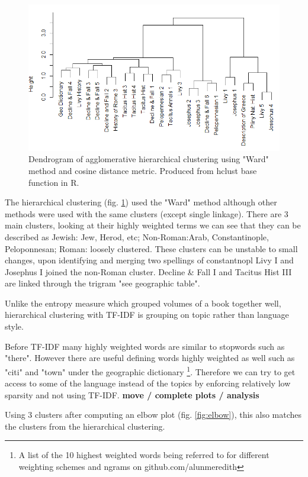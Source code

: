 \documentclass[a4paper,10pt, twocolumn]{article}
\begin{document}
\begin{figure}
	\includegraphics[width=0.9\linewidth]{dendorgram.png}
	\centering
	\caption{Dendrogram of agglomerative hierarchical  clustering using "Ward" method and cosine distance metric. Produced from hclust base function in R.}
	\label{fig:heir}
\end{figure} 

The hierarchical  clustering (fig. \ref{fig:heir}) used the "Ward" method although other methods were used with the same clusters (except single linkage). There are 3 main clusters, looking at their highly weighted terms we can see that they can be described as Jewish: Jew, Herod, etc; Non-Roman:Arab, Constantinople, Peloponnesan; Roman: loosely clustered. These clusters can be unstable to small changes, upon identifying and merging two spellings of constantnopl Livy I and Josephus I joined the non-Roman cluster. Decline \& Fall I and Tacitus Hist III are linked through the trigram "see geographic table". 

Unlike the entropy measure which grouped volumes of a book together well, hierarchical clustering with TF-IDF is grouping on topic rather than language style. 

Before TF-IDF many highly weighted words are similar to stopwords such as "there". However there are useful defining words highly weighted as well such as "citi" and "town" under the geographic dictionary \footnote{A list of the 10 highest weighted words being referred to for different weighting schemes and ngrams on github.com/alunmeredith}. Therefore we can try to get access to some of the language instead of the topics by enforcing relatively low sparsity and not using TF-IDF. \textbf{move / complete plots / analysis} 

Using 3 clusters after computing an elbow plot (fig. \ref{fig:elbow}), this also matches the clusters from the hierarchical clustering. 
\end{document}
